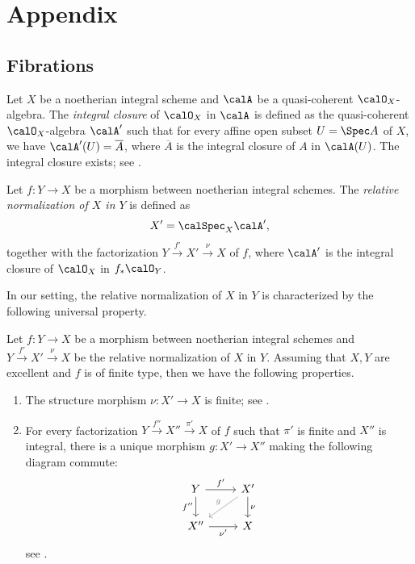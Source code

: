 \section{Appendix}


\subsection{Fibrations}

\begin{construction}
	Let $X$ be a noetherian integral scheme and $\calA$ be a quasi-coherent $\calO_X$-algebra.
	The \emph{integral closure} of $\calO_X$ in $\calA$ is defined as the quasi-coherent $\calO_X$-algebra $\calA'$ such that for every affine open subset $U = \Spec A$ of $X$, we have $\calA'(U) = \overline{A}$, where $\overline{A}$ is the integral closure of $A$ in $\calA(U)$.
	The integral closure exists; see \cite[\href{https://stacks.math.columbia.edu/tag/035F}{Tag 035F}]{Stacks}.

	Let $f: Y \to X$ be a morphism between noetherian integral schemes.
	The \emph{relative normalization of $X$ in $Y$} is defined as
	\[ X' = \calSpec_X \calA', \]
	together with the factorization $Y \xrightarrow{f'} X' \xrightarrow{\nu} X$ of $f$,
	where $\calA'$ is the integral closure of $\calO_X$ in $f_* \calO_Y$.
\end{construction}

In our setting, the relative normalization of $X$ in $Y$ is characterized by the following universal property.

\begin{proposition}\label{prop:universal_property_of_relative_normalization}
	Let $f: Y \to X$ be a morphism between noetherian integral schemes and $Y \xrightarrow{f'} X' \xrightarrow{\nu} X$ be the relative normalization of $X$ in $Y$.
	Assuming that $X,Y$ are excellent and $f$ is of finite type, then we have the following properties.
	\begin{enumerate}
		\item The structure morphism $\nu: X' \to X$ is finite; see \cite[\href{https://stacks.math.columbia.edu/tag/03GR}{Tag 03GR}]{Stacks}.
		\item For every factorization $Y \xrightarrow{f''} X'' \xrightarrow{\pi'} X$ of $f$ such that $\pi'$ is finite and $X''$ is integral, there is a unique morphism $g: X' \to X''$ making the following diagram commute:
		      \[
			      \begin{tikzcd}
				      Y \ar[r, "f'"] \ar[d, "f''"'] & X' \ar[d, "\nu"] \ar[ld, gray, "g"'] \\
				      X'' \ar[r, "\nu'"'] & X
			      \end{tikzcd}
		      \]
		      see \cite[\href{https://stacks.math.columbia.edu/tag/035I}{Tag 035I}]{Stacks}.
	\end{enumerate}
\end{proposition}

